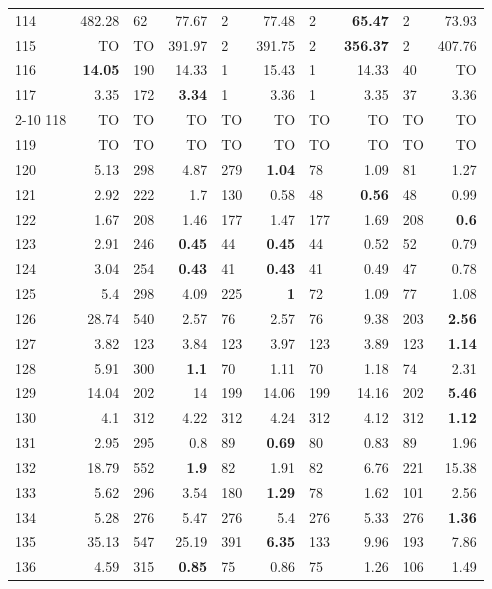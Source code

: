 \begin{longtable}{lr@{\hskip 4pt}l@{\hskip 12pt}r@{\hskip 4pt}l@{\hskip 12pt}r@{\hskip 4pt}l@{\hskip 12pt}r@{\hskip 4pt}l@{\hskip 12pt}r}
114 & 482.28 & 62 & 77.67 & 2 & 77.48 & 2 & \textbf{65.47} & 2 & 73.93 \\
115 & TO & TO & 391.97 & 2 & 391.75 & 2 & \textbf{356.37} & 2 & 407.76 \\
116 & \textbf{14.05} & 190 & 14.33 & 1 & 15.43 & 1 & 14.33 & 40 & TO \\
117 & 3.35 & 172 & \textbf{3.34} & 1 & 3.36 & 1 & 3.35 & 37 & 3.36 \\
\cmidrule{2-10}
118 & TO & TO & TO & TO & TO & TO & TO & TO & TO \\
119 & TO & TO & TO & TO & TO & TO & TO & TO & TO \\
\midrule
120 & 5.13 & 298 & 4.87 & 279 & \textbf{1.04} & 78 & 1.09 & 81 & 1.27 \\
121 & 2.92 & 222 & 1.7 & 130 & 0.58 & 48 & \textbf{0.56} & 48 & 0.99 \\
122 & 1.67 & 208 & 1.46 & 177 & 1.47 & 177 & 1.69 & 208 & \textbf{0.6} \\
123 & 2.91 & 246 & \textbf{0.45} & 44 & \textbf{0.45} & 44 & 0.52 & 52 & 0.79 \\
124 & 3.04 & 254 & \textbf{0.43} & 41 & \textbf{0.43} & 41 & 0.49 & 47 & 0.78 \\
125 & 5.4 & 298 & 4.09 & 225 & \textbf{1} & 72 & 1.09 & 77 & 1.08 \\
126 & 28.74 & 540 & 2.57 & 76 & 2.57 & 76 & 9.38 & 203 & \textbf{2.56} \\
127 & 3.82 & 123 & 3.84 & 123 & 3.97 & 123 & 3.89 & 123 & \textbf{1.14} \\
128 & 5.91 & 300 & \textbf{1.1} & 70 & 1.11 & 70 & 1.18 & 74 & 2.31 \\
129 & 14.04 & 202 & 14 & 199 & 14.06 & 199 & 14.16 & 202 & \textbf{5.46} \\
130 & 4.1 & 312 & 4.22 & 312 & 4.24 & 312 & 4.12 & 312 & \textbf{1.12} \\
131 & 2.95 & 295 & 0.8 & 89 & \textbf{0.69} & 80 & 0.83 & 89 & 1.96 \\
132 & 18.79 & 552 & \textbf{1.9} & 82 & 1.91 & 82 & 6.76 & 221 & 15.38 \\
133 & 5.62 & 296 & 3.54 & 180 & \textbf{1.29} & 78 & 1.62 & 101 & 2.56 \\
134 & 5.28 & 276 & 5.47 & 276 & 5.4 & 276 & 5.33 & 276 & \textbf{1.36} \\
135 & 35.13 & 547 & 25.19 & 391 & \textbf{6.35} & 133 & 9.96 & 193 & 7.86 \\
136 & 4.59 & 315 & \textbf{0.85} & 75 & 0.86 & 75 & 1.26 & 106 & 1.49 \\

\end{longtable}

